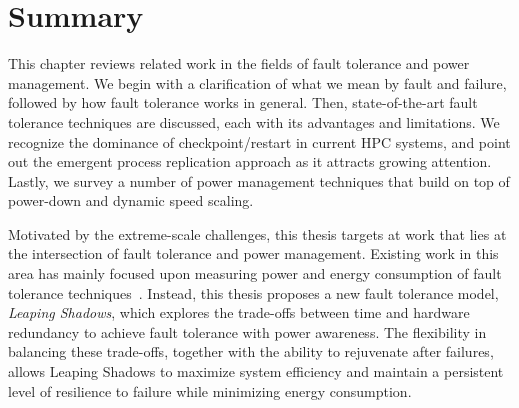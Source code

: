 \section{Summary}
This chapter reviews related work in the fields of fault tolerance and power management. We begin with a clarification of what we mean by fault and failure, followed by how fault tolerance works in general. Then, state-of-the-art fault tolerance techniques are discussed, each with its advantages and limitations. We recognize the dominance of checkpoint/restart in current HPC systems, and point out the emergent process replication approach as it attracts growing attention. Lastly, we survey a number of power management techniques that build on top of power-down and dynamic speed scaling.   

Motivated by the extreme-scale challenges, this thesis targets at work that lies at the intersection of fault tolerance and power management. Existing work in this area has mainly focused upon measuring power and energy consumption of fault tolerance techniques~\cite{meneses2012assessing,saito2013energy,mills2014energy}. Instead, this thesis proposes a new fault tolerance model, \textit{Leaping Shadows}, which 
explores the trade-offs between time and hardware redundancy to achieve fault tolerance with power awareness. The flexibility in balancing these trade-offs, together with the ability to rejuvenate after failures, allows Leaping Shadows to maximize system efficiency and maintain a persistent level of resilience to failure while minimizing energy consumption.
